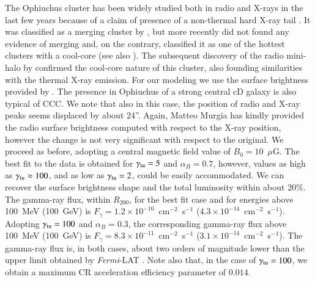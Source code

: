 \documentclass[traditabstract]{aa}
\begin{document}
The Ophiuchus cluster has been widely studied both in radio and X-rays in the last few years because of a claim of presence of a non-thermal hard X-ray tail \citep{2008A&A...479...27E,2008PASJ...60.1133F,2009A&A...499..371G,2009A&A...499..679M,2009MNRAS.396.2237P,2009A&A...508.1161N,2010A&A...514A..76M,2010MNRAS.405.1624M}. It was classified as a merging cluster by \cite{2001PASJ...53..605W}, but more recently \cite{2008PASJ...60.1133F} did not found any evidence of merging and, on the contrary, classified it as one of the hottest clusters with a  cool-core (see also \citealp{2010MNRAS.405.1624M}). The subsequent discovery of the radio mini-halo by \cite{2009A&A...499..371G} confirmed the cool-core nature of this cluster, also founding similarities with the thermal X-ray emission. For our modeling we use the surface brightness provided by \cite{2009A&A...499..679M}.  The presence in Ophiuchus of a strong central cD galaxy is also typical of CCC.
We note that also in this case, the position of radio and X-ray peaks seems displaced by about 24''. Again, Matteo Murgia has kindly provided the radio surface brightness computed with respect to the \cite{2002ApJ...567..716R} X-ray position, however the change is not very significant with respect to the original. 
We proceed as before, adopting a central magnetic field value of $B_{0}=10$~$\mu$G.
The best fit to the data is obtained for $\gamma_{\rm{tu}}=5$ and $\alpha_B=0.7$, however, values as high as $\gamma_{\rm{tu}} \approx 100$, and as low as $\gamma_{\rm{tu}}=2$, could be easily accommodated. We can recover the surface brightness shape and the total luminosity within about $20\%$. The gamma-ray flux, within $R_{200}$, for the best fit case and for energies above 100~MeV (100~GeV) is $F_{\gamma} = 1.2 \times 10^{-10}$~cm$^{-2}$~s$^{-1}$ ($4.3 \times 10^{-14}$~cm$^{-2}$~s$^{-1}$). Adopting $\gamma_{\rm{tu}}=100$ and $\alpha_B=0.3$, the corresponding gamma-ray flux above 100~MeV (100~GeV) is $F_{\gamma} = 8.3 \times 10^{-11}$~cm$^{-2}$~s$^{-1}$ ($3.1 \times 10^{-14}$~cm$^{-2}$~s$^{-1}$). The gamma-ray flux is, in both cases, about two orders of magnitude lower than the upper limit obtained by \emph{Fermi}-LAT \citep{2010ApJ...717L..71A}. Note also that, in the case of $\gamma_{\rm{tu}} = 100$, we obtain a maximum CR acceleration efficiency parameter of $0.014$. 
\end{document}
